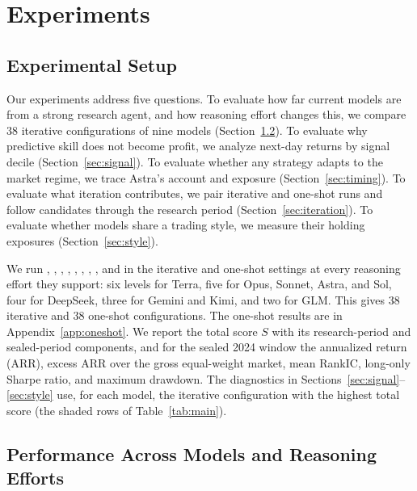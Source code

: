 \section{Experiments}
\label{sec:experiments}

\subsection{Experimental Setup}

Our experiments address five questions. To evaluate how far current models are from a strong research agent, and how reasoning effort changes this, we compare 38 iterative configurations of nine models (Section~\ref{sec:overall}). To evaluate why predictive skill does not become profit, we analyze next-day returns by signal decile (Section~\ref{sec:signal}). To evaluate whether any strategy adapts to the market regime, we trace Astra's account and exposure (Section~\ref{sec:timing}). To evaluate what iteration contributes, we pair iterative and one-shot runs and follow candidates through the research period (Section~\ref{sec:iteration}). To evaluate whether models share a trading style, we measure their holding exposures (Section~\ref{sec:style}).

We run \ModelClaudeOpus{}, \ModelClaudeSonnet{}, \ModelAstra{}, \ModelSol{}, \ModelTerra{}, \ModelGemini{}, \ModelDeepSeek{}, \ModelKimi{}, and \ModelGLM{} in the iterative and one-shot settings at every reasoning effort they support: six levels for Terra, five for Opus, Sonnet, Astra, and Sol, four for DeepSeek, three for Gemini and Kimi, and two for GLM. This gives 38 iterative and 38 one-shot configurations. The one-shot results are in Appendix~\ref{app:oneshot}. We report the total score $S$ with its research-period and sealed-period components, and for the sealed 2024 window the annualized return (ARR), excess ARR over the gross equal-weight market, mean RankIC, long-only Sharpe ratio, and maximum drawdown. The diagnostics in Sections~\ref{sec:signal}--\ref{sec:style} use, for each model, the iterative configuration with the highest total score (the shaded rows of Table~\ref{tab:main}).

\subsection{Performance Across Models and Reasoning Efforts}
\label{sec:overall}

\begin{table}[!t]

\end{table}

